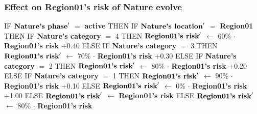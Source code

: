 \documentclass{article}%
\begin{document}
%
\subsubsection{Effect on Region01's risk of Nature evolve}%
\label{ssubsec:Effect on Region01's risk of Nature evolve}%
\begin{flushleft}%
IF %
$\mbox{\textbf{Nature's phase}} '$%
$=$%
\textbf{active}%
\linebreak%
\hspace*{2em}%
THEN %
IF %
$\mbox{\textbf{Nature's location}} '$%
$=$%
\textbf{Region01}%
\linebreak%
\hspace*{4em}%
THEN %
IF %
\textbf{Nature's category}%
$=$%
4%
\linebreak%
\hspace*{6em}%
THEN %
$\mbox{\textbf{Region01's risk}} '$%
$\leftarrow$%
60\%%
$\cdot$%
\textbf{Region01's risk}%
+0.40%
\linebreak%
\hspace*{6em}%
ELSE %
IF %
\textbf{Nature's category}%
$=$%
3%
\linebreak%
\hspace*{8em}%
THEN %
$\mbox{\textbf{Region01's risk}} '$%
$\leftarrow$%
70\%%
$\cdot$%
\textbf{Region01's risk}%
+0.30%
\linebreak%
\hspace*{8em}%
ELSE %
IF %
\textbf{Nature's category}%
$=$%
2%
\linebreak%
\hspace*{10em}%
THEN %
$\mbox{\textbf{Region01's risk}} '$%
$\leftarrow$%
80\%%
$\cdot$%
\textbf{Region01's risk}%
+0.20%
\linebreak%
\hspace*{10em}%
ELSE %
IF %
\textbf{Nature's category}%
$=$%
1%
\linebreak%
\hspace*{12em}%
THEN %
$\mbox{\textbf{Region01's risk}} '$%
$\leftarrow$%
90\%%
$\cdot$%
\textbf{Region01's risk}%
+0.10%
\linebreak%
\hspace*{12em}%
ELSE %
$\mbox{\textbf{Region01's risk}} '$%
$\leftarrow$%
0\%%
$\cdot$%
\textbf{Region01's risk}%
+1.00%
\linebreak%
\hspace*{4em}%
ELSE %
$\mbox{\textbf{Region01's risk}} '$%
$\leftarrow$%
\textbf{Region01's risk}%
\linebreak%
\hspace*{2em}%
ELSE %
$\mbox{\textbf{Region01's risk}} '$%
$\leftarrow$%
80\%%
$\cdot$%
\textbf{Region01's risk}%
\end{flushleft}
\end{document}
